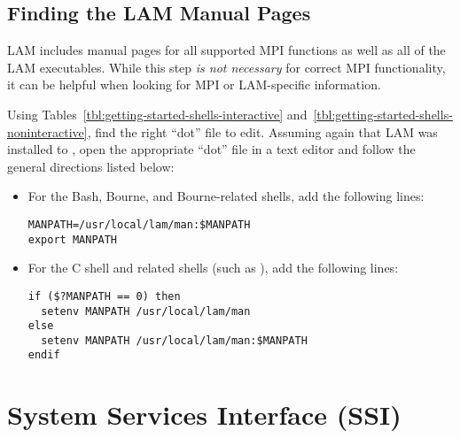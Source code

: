 
\subsection{Finding the LAM Manual Pages}

LAM includes manual pages for all supported MPI functions as well as
all of the LAM executables.  While this step {\em is not necessary}
for correct MPI functionality, it can be helpful when looking for MPI
or LAM-specific information.

Using Tables~\ref{tbl:getting-started-shells-interactive}
and~\ref{tbl:getting-started-shells-noninteractive}, find the right
``dot'' file to edit.  Assuming again that LAM was installed to
, open the appropriate ``dot'' file in a text
editor and follow the general directions listed below:

\begin{itemize}
\item For the Bash, Bourne, and Bourne-related shells, add the
  following lines:

  \lstset{style=lam-bourne}
  \begin{lstlisting}
MANPATH=/usr/local/lam/man:$MANPATH
export MANPATH
  \end{lstlisting}
  
\item For the C shell and related shells (such as ), add the
  following lines:

  \lstset{style=lam-shell}
  \begin{lstlisting}
if ($?MANPATH == 0) then
  setenv MANPATH /usr/local/lam/man
else
  setenv MANPATH /usr/local/lam/man:$MANPATH
endif
  \end{lstlisting}
  
\end{itemize}


\section{System Services Interface (SSI)}
\label{sec:getting-started-ssi}

